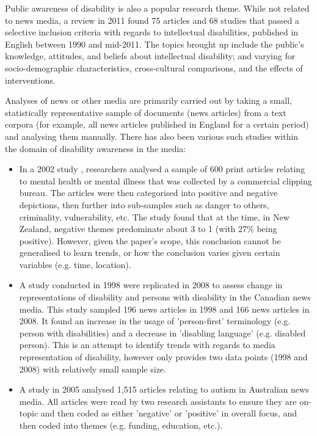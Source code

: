 \documentclass{report}
\begin{document}
Public awareness of disability is also a popular research theme.
While not related to news media, a review in 2011 \cite{scior2011public} found 75 articles and 68 studies that passed a selective inclusion criteria with regards to intellectual disabilities, published in English between 1990 and mid-2011.
The topics brought up include the public's knowledge, attitudes, and beliefs about intellectual disability; and varying for socio-demographic characteristics, cross-cultural comparisons, and the effects of interventions.

Analyses of news or other media are primarily carried out by taking a small, statistically representative sample of documents (news articles) from a text corpora (for example, all news articles published in England for a certain period) and analysing them manually. There has also been various such studies within the domain of disability awareness in the media:
\begin{itemize}
	\item In a 2002 study \cite{coverdale2002depictions}, researchers analysed a sample of 600 print articles relating to mental health or mental illness that was collected by a commercial clipping bureau.
		The articles were then categorised into positive and negative depictions, then further into sub-samples such as danger to others, criminality, vulnerability, etc.
		The study found that at the time, in New Zealand, negative themes predominate about 3 to 1 (with 27\% being positive).
		However, given the paper's scope, this conclusion cannot be generalised to learn trends, or how the conclusion varies given certain variables (e.g. time, location).
	\item A study conducted in 1998 \cite{gold1999media} were replicated in 2008 \cite{devotta2013representations} to assess change in representations of disability and persons with disability in the Canadian news media.
		This study sampled 196 news articles in 1998 and 166 news articles in 2008.
		It found an increase in the usage of 'person-first' terminology (e.g. person with disabilities) and a decrease in 'disabling language' (e.g. disabled person). %
		This is an attempt to identify trends with regards to media representation of disability, however only provides two data points (1998 and 2008) with relatively small sample size.
	\item A study in 2005 \cite{jones2009representations} analysed 1,515 articles relating to autism in Australian news media.
		All articles were read by two research assistants to ensure they are on-topic and then coded as either 'negative' or 'positive' in overall focus, and then coded into themes (e.g. funding, education, etc.).
\end{itemize}
\end{document}
